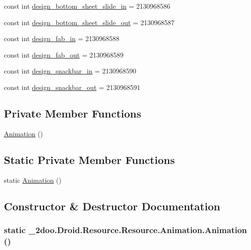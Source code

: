 \begin{CompactItemize}
\item 
const int \hyperlink{class__2doo_1_1_droid_1_1_resource_1_1_animation_9f0461b23bcaf65df92e76a9ba27099e}{design\_\-bottom\_\-sheet\_\-slide\_\-in} = 2130968586
\item 
const int \hyperlink{class__2doo_1_1_droid_1_1_resource_1_1_animation_e50a4b523ff92abed12b49985d03f282}{design\_\-bottom\_\-sheet\_\-slide\_\-out} = 2130968587
\item 
const int \hyperlink{class__2doo_1_1_droid_1_1_resource_1_1_animation_95910bb66e23739c0cdf494c58acbea2}{design\_\-fab\_\-in} = 2130968588
\item 
const int \hyperlink{class__2doo_1_1_droid_1_1_resource_1_1_animation_8b59c2b886c71df53ce439fd3fdce2ef}{design\_\-fab\_\-out} = 2130968589
\item 
const int \hyperlink{class__2doo_1_1_droid_1_1_resource_1_1_animation_0d67f4ef7ce2d5b25f689767e6943135}{design\_\-snackbar\_\-in} = 2130968590
\item 
const int \hyperlink{class__2doo_1_1_droid_1_1_resource_1_1_animation_1961127b3aa94a9ef1583c626212cab0}{design\_\-snackbar\_\-out} = 2130968591
\end{CompactItemize}
\subsection*{Private Member Functions}
\begin{CompactItemize}
\item 
\hyperlink{class__2doo_1_1_droid_1_1_resource_1_1_animation_a521e7a680799c6638237e391f559f8c}{Animation} ()
\end{CompactItemize}
\subsection*{Static Private Member Functions}
\begin{CompactItemize}
\item 
static \hyperlink{class__2doo_1_1_droid_1_1_resource_1_1_animation_5a2e420e98369fd1606cd59ce832cb6d}{Animation} ()
\end{CompactItemize}


\subsection{Constructor \& Destructor Documentation}
\hypertarget{class__2doo_1_1_droid_1_1_resource_1_1_animation_5a2e420e98369fd1606cd59ce832cb6d}{
\subsubsection[{Animation}]{\setlength{\rightskip}{0pt plus 5cm}static \_\-2doo.Droid.Resource.Resource.Animation.Animation ()}}
\label{class__2doo_1_1_droid_1_1_resource_1_1_animation_5a2e420e98369fd1606cd59ce832cb6d}


